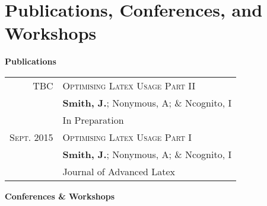 \documentclass[a4paper,10pt]{article}
\begin{document}
\section{Publications, Conferences, and Workshops}

\textbf{Publications}

\begin{tabular}{rp{11cm}}
%
\textsc{TBC}  		& \textsc{Optimising Latex Usage Part II} \\
					& {\footnotesize \textbf{Smith, J.}; Nonymous, A; \& Ncognito, I} \\
					& {\footnotesize In Preparation} \\

\textsc{Sept.} 2015 & \textsc{Optimising Latex Usage Part I} \\
					& {\footnotesize \textbf{Smith, J.}; Nonymous, A; \& Ncognito, I} \\
					& {\footnotesize Journal of Advanced Latex} \\
%
\end{tabular} 

\textbf{Conferences \& Workshops} 
\end{document}
